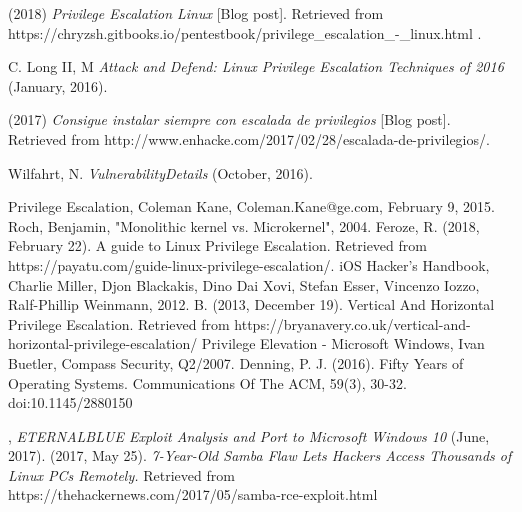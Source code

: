 \documentclass[letterpaper, 10pt, journal]{IEEEtran}
\begin{document}
\begin{thebibliography}{1}
 (2018) \emph{Privilege Escalation Linux} [Blog post]. Retrieved from https://chryzsh.gitbooks.io/pentestbook/privilege\_escalation\_-\_linux.html .

 C. Long II, M \emph{Attack and Defend: Linux Privilege Escalation Techniques of 2016} (January, 2016).

 (2017) \emph{Consigue instalar siempre con escalada de privilegios} [Blog post]. Retrieved from http://www.enhacke.com/2017/02/28/escalada-de-privilegios/.

 Wilfahrt, N. \emph{VulnerabilityDetails} (October, 2016).

\bibitem{[11]} Privilege Escalation, Coleman Kane, Coleman.Kane@ge.com, February 9, 2015.
\bibitem{[2]} Roch, Benjamin, "Monolithic kernel vs. Microkernel", 2004.
\bibitem{[3]} Feroze, R. (2018, February 22). A guide to Linux Privilege Escalation. Retrieved from https://payatu.com/guide-linux-privilege-escalation/.
\bibitem{[4]} iOS Hacker’s Handbook, Charlie Miller, Djon Blackakis, Dino Dai Xovi, Stefan Esser, Vincenzo Iozzo, Ralf-Phillip Weinmann, 2012.
\bibitem{[5]} B. (2013, December 19). Vertical And Horizontal Privilege Escalation. Retrieved from https://bryanavery.co.uk/vertical-and-horizontal-privilege-escalation/ 
\bibitem{[6]} Privilege Elevation - Microsoft Windows, Ivan Buetler, Compass Security, Q2/2007.
Denning, P. J. (2016). Fifty Years of Operating Systems. Communications Of The ACM, 59(3), 30-32. doi:10.1145/2880150

, \emph{ETERNALBLUE Exploit Analysis and Port to Microsoft Windows 10} (June, 2017).
 (2017, May 25). \emph{7-Year-Old Samba Flaw Lets Hackers Access Thousands of Linux PCs Remotely.} Retrieved from https://thehackernews.com/2017/05/samba-rce-exploit.html 


\end{thebibliography}
\end{document}
